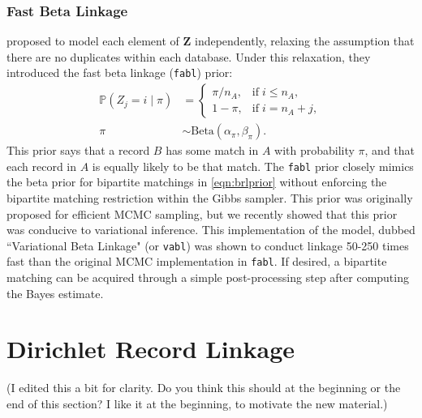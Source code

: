 \documentclass[12pt,letterpaper]{article}
\newcommand{\1}[1]{\mathbb{I}\!\left[#1\right]} %
\def \brian#1{{\color{red} (#1)}}
\begin{document}
\subsubsection{Fast Beta Linkage}\label{sec:fabl}

\cite{kundinger_2023} proposed to model each element of $\bm{Z}$ independently, relaxing the assumption that there are no duplicates within each database. Under this relaxation, they introduced the fast beta linkage (\texttt{fabl}) prior:
\begin{align}\label{eqn:fabl}
	\mathbb{P}(Z_j = i \mid \pi) 
	&=
	\begin{cases}
		\pi/n_A,  &  \text{if}  \; i\leq n_A,\\
		1- \pi, &   \text{if}  \;  i= n_A + j,
	\end{cases} \\
	\pi &\sim \text{Beta}(\alpha_{\pi}, \beta_{\pi}).
\end{align}
This prior says that a record $B$ has some match in $A$ with probability $\pi$, and that each record in $A$ is equally likely to be that match. The \texttt{fabl} prior closely mimics the beta prior for bipartite matchings in \eqref{eqn:brlprior} without enforcing the bipartite matching restriction within the Gibbs sampler. This prior was originally proposed for efficient MCMC sampling, but we recently showed that this prior was conducive to variational inference. This implementation of the model, dubbed ``Variational Beta Linkage" (or \texttt{vabl}) was shown to conduct linkage 50-250 times fast than the original MCMC implementation in \texttt{fabl}\citep{kundinger_2024_vabl}. If desired, a bipartite matching can be acquired through a simple post-processing step after computing the Bayes estimate. 

\section{Dirichlet Record Linkage}\label{sec:drl}


\brian{I edited this a bit for clarity. Do you think this should at the beginning or the end of this section? I like it at the beginning, to motivate the new material.}
\end{document}
